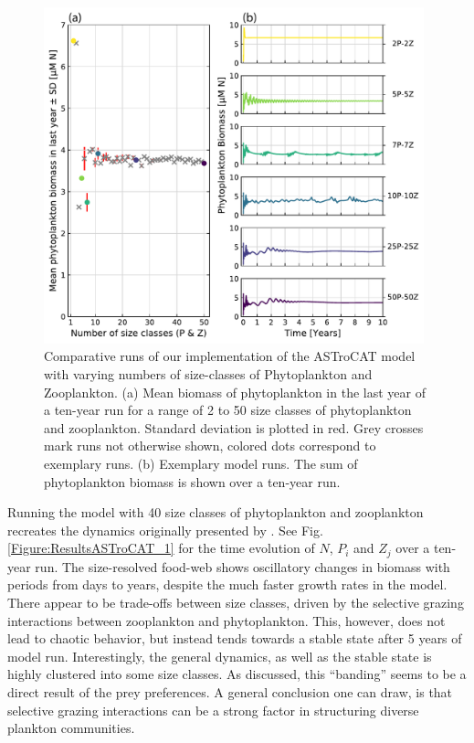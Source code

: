 \documentclass[journal abbreviation, manuscript]{copernicus}
\begin{document}
\begin{figure}[t]
\includegraphics[width=11cm]{Figures/firstdraft_plots/03_ASTroCAT_sizeclassrange.pdf}
\caption{Comparative runs of our implementation of the ASTroCAT model with varying numbers of size-classes of Phytoplankton and Zooplankton. (a) Mean biomass of phytoplankton in the last year of a ten-year run for a range of 2 to 50 size classes of phytoplankton and zooplankton. Standard deviation is plotted in red. Grey crosses mark runs not otherwise shown, colored dots correspond to exemplary runs. (b) Exemplary model runs. The sum of phytoplankton biomass is shown over a ten-year run.}
\label{Figure:ResultsASTroCAT_2}
\end{figure}

Running the model with 40 size classes of phytoplankton and zooplankton recreates the dynamics originally presented by \citet{Banas2011b}. See Fig. \ref{Figure:ResultsASTroCAT_1} for the time evolution of $N$, $P_i$ and $Z_j$ over a ten-year run. The size-resolved food-web shows oscillatory changes in biomass with periods from days to years, despite the much faster growth rates in the model. There appear to be trade-offs between size classes, driven by the selective grazing interactions between zooplankton and phytoplankton. This, however, does not lead to chaotic behavior, but instead tends towards a stable state after 5 years of model run. Interestingly, the general dynamics, as well as the stable state is highly clustered into some size classes. As \citet{Banas2011b} discussed, this “banding” seems to be a direct result of the prey preferences. A general conclusion one can draw, is that selective grazing interactions can be a strong factor in structuring diverse plankton communities.
\end{document}
